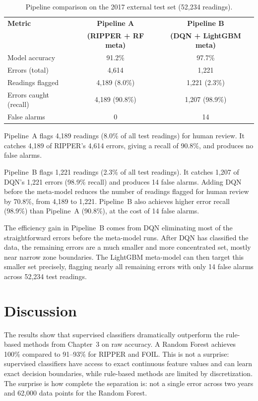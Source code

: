 \begin{table}[h]
\centering
\caption[Pipeline comparison - 2017 external test set]{Pipeline comparison on the 2017 external test set (52,234 readings).}
\label{tab:ch4:pipeline}
\small
\begin{tabular}{lcc}
\toprule
\textbf{Metric} & \textbf{Pipeline A} & \textbf{Pipeline B} \\
                & \textbf{(RIPPER + RF meta)} & \textbf{(DQN + LightGBM meta)} \\
\midrule
Model accuracy        & 91.2\%          & 97.7\% \\
Errors (total)        & 4,614           & 1,221 \\
Readings flagged      & 4,189 (8.0\%)   & 1,221 (2.3\%) \\
Errors caught (recall)& 4,189 (90.8\%)  & 1,207 (98.9\%) \\
False alarms          & 0               & 14 \\
\bottomrule
\end{tabular}
\end{table}

Pipeline~A flags 4,189 readings (8.0\% of all test readings) for human review. It catches
4,189 of RIPPER's 4,614 errors, giving a recall of 90.8\%, and produces no false alarms.

Pipeline~B flags 1,221 readings (2.3\% of all test readings). It catches 1,207 of DQN's
1,221 errors (98.9\% recall) and produces 14 false alarms. Adding DQN before the
meta-model reduces the number of readings flagged for human review by 70.8\%, from 4,189
to 1,221. Pipeline~B also achieves higher error recall (98.9\%) than Pipeline~A (90.8\%),
at the cost of 14 false alarms.

The efficiency gain in Pipeline~B comes from DQN eliminating most of the straightforward
errors before the meta-model runs. After DQN has classified the data, the remaining
errors are a much smaller and more concentrated set, mostly near narrow zone boundaries.
The LightGBM meta-model can then target this smaller set precisely, flagging nearly all
remaining errors with only 14 false alarms across 52,234 test readings.

\section{Discussion}
\label{sec:ch4:discussion}

The results show that supervised classifiers dramatically outperform the rule-based
methods from Chapter~3 on raw accuracy. A Random Forest achieves 100\% compared to
91--93\% for RIPPER and FOIL. This is not a surprise: supervised classifiers have access
to exact continuous feature values and can learn exact decision boundaries, while
rule-based methods are limited by discretization. The surprise is how complete the
separation is: not a single error across two years and 62,000 data points for the
Random Forest.

